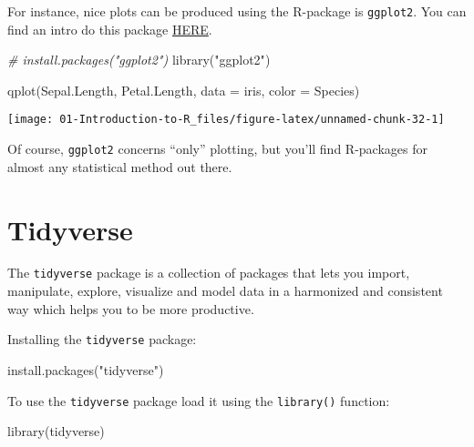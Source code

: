 \documentclass[
]{book}
\newenvironment{Shaded}{\begin{snugshade}}{\end{snugshade}}
\newcommand{\AttributeTok}[1]{\textcolor[rgb]{0.77,0.63,0.00}{#1}}
\newcommand{\CommentTok}[1]{\textcolor[rgb]{0.56,0.35,0.01}{\textit{#1}}}
\newcommand{\FunctionTok}[1]{\textcolor[rgb]{0.00,0.00,0.00}{#1}}
\newcommand{\NormalTok}[1]{#1}
\newcommand{\StringTok}[1]{\textcolor[rgb]{0.31,0.60,0.02}{#1}}
\begin{document}
For instance, nice plots can be produced using the R-package is \texttt{ggplot2}. You can find an intro do this package \href{http://ggplot2.tidyverse.org/}{HERE}.

\begin{Shaded}
\begin{Highlighting}[]
\CommentTok{\# install.packages("ggplot2")}
\FunctionTok{library}\NormalTok{(}\StringTok{"ggplot2"}\NormalTok{)}

\FunctionTok{qplot}\NormalTok{(Sepal.Length, Petal.Length, }\AttributeTok{data =}\NormalTok{ iris, }\AttributeTok{color =}\NormalTok{ Species)}
\end{Highlighting}
\end{Shaded}

\begin{center}\texttt{[image: 01-Introduction-to-R\_files/figure-latex/unnamed-chunk-32-1]} \end{center}

\hfill\break

Of course, \texttt{ggplot2} concerns ``only'' plotting, but you'll find R-packages for almost any statistical method out there.

\hypertarget{tidyverse}{%
\section{Tidyverse}\label{tidyverse}}

The \texttt{tidyverse} package is a collection of packages that lets you import,
manipulate, explore, visualize and model data in a harmonized and consistent way which
helps you to be more productive.

Installing the \texttt{tidyverse} package:

\begin{Shaded}
\begin{Highlighting}[]
\FunctionTok{install.packages}\NormalTok{(}\StringTok{"tidyverse"}\NormalTok{)}
\end{Highlighting}
\end{Shaded}

To use the \texttt{tidyverse} package load it using the \texttt{library()} function:

\begin{Shaded}
\begin{Highlighting}[]
\FunctionTok{library}\NormalTok{(tidyverse)}
\end{Highlighting}
\end{Shaded}
\end{document}
